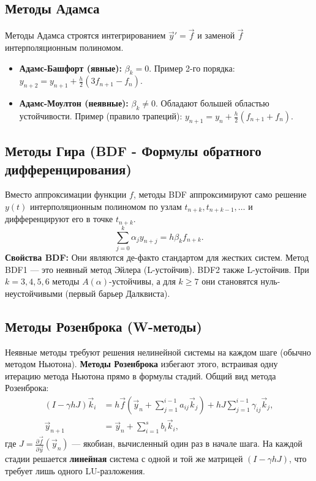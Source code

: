 \documentclass[12pt,a4paper]{article}
\begin{document}
\subsection{Методы Адамса}
Методы Адамса строятся интегрированием $\vec{y}'=\vec{f}$ и заменой $\vec{f}$ интерполяционным полиномом.
\begin{itemize}
    \item \textbf{Адамс-Башфорт (явные):} $\beta_k = 0$. Пример 2-го порядка: 
    $y_{n+2} = y_{n+1} + \frac{h}{2}(3f_{n+1} - f_n)$.
    \item \textbf{Адамс-Моултон (неявные):} $\beta_k \ne 0$. Обладают большей областью устойчивости. Пример (правило трапеций): 
    $y_{n+1} = y_n + \frac{h}{2}(f_{n+1} + f_n)$.
\end{itemize}

\subsection{Методы Гира (BDF - Формулы обратного дифференцирования)}
Вместо аппроксимации функции $f$, методы BDF аппроксимируют само решение $y(t)$ интерполяционным полиномом по узлам $t_{n+k}, t_{n+k-1}, \dots$ и дифференцируют его в точке $t_{n+k}$.
\begin{equation}
    \sum_{j=0}^k \alpha_j y_{n+j} = h \beta_k f_{n+k}.
\end{equation}
\textbf{Свойства BDF:} Они являются де-факто стандартом для жестких систем. Метод BDF1 — это неявный метод Эйлера (L-устойчив). BDF2 также L-устойчив. При $k=3,4,5,6$ методы $A(\alpha)$-устойчивы, а для $k \ge 7$ они становятся нуль-неустойчивыми (первый барьер Далквиста).

\subsection{Методы Розенброка (W-методы)}
Неявные методы требуют решения нелинейной системы на каждом шаге (обычно методом Ньютона). \textbf{Методы Розенброка} избегают этого, встраивая одну итерацию метода Ньютона прямо в формулы стадий.
Общий вид метода Розенброка:
\begin{align}
    (I - \gamma h J) \vec{k}_i &= h \vec{f}\left( \vec{y}_n + \sum_{j=1}^{i-1} a_{ij} \vec{k}_j \right) + h J \sum_{j=1}^{i-1} \gamma_{ij} \vec{k}_j, \\
    \vec{y}_{n+1} &= \vec{y}_n + \sum_{i=1}^s b_i \vec{k}_i,
\end{align}
где $J = \frac{\partial \vec{f}}{\partial \vec{y}}(\vec{y}_n)$ — якобиан, вычисленный один раз в начале шага. На каждой стадии решается \textbf{линейная} система с одной и той же матрицей $(I - \gamma h J)$, что требует лишь одного LU-разложения.
\end{document}
